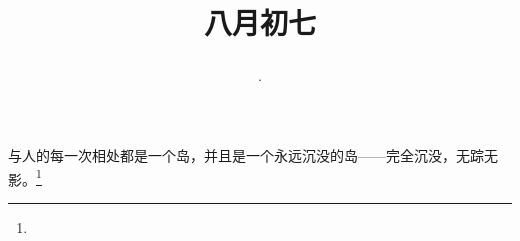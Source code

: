 \title{\date[d=9,m=9,y=2024][year:cn-y,年,month:cn,day:cn,日,·,weekday]·八月初七 }
与人的每一次相处都是一个岛，并且是一个永远沉没的岛——完全沉没，无踪无影。\footnote{ }

